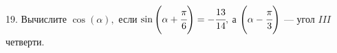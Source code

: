 19. Вычислите $\cos(\alpha),$ если $\sin\left(\alpha+\cfrac{\pi}{6}\right)=-\cfrac{13}{14},$ а $\left(\alpha-\cfrac{\pi}{3}\right)$ --- угол $III$ четверти.\\

